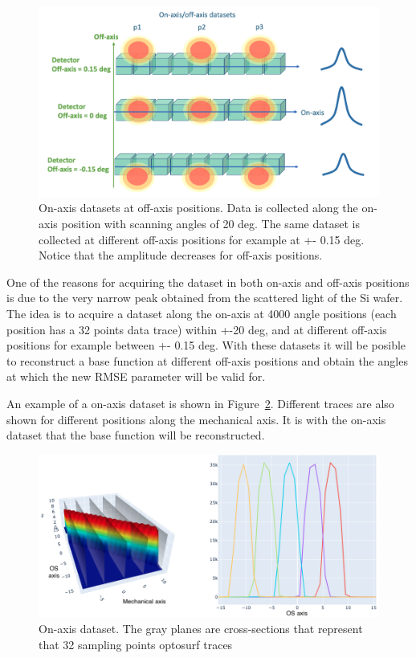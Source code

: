 \documentclass[
  letterpaper,
  DIV=11,
  numbers=noendperiod,
  oneside]{scrreprt}
\begin{document}
\begin{figure}

{\centering \includegraphics{notebooks/figures/b/fig_3_3_onoffaxis.png}

}

\caption{\label{fig-3-7}On-axis datasets at off-axis positions. Data is
collected along the on-axis position with scanning angles of 20 deg. The
same dataset is collected at different off-axis positions for example at
+- 0.15 deg. Notice that the amplitude decreases for off-axis
positions.}

\end{figure}

One of the reasons for acquiring the dataset in both on-axis and
off-axis positions is due to the very narrow peak obtained from the
scattered light of the Si wafer. The idea is to acquire a dataset along
the on-axis at 4000 angle positions (each position has a 32 points data
trace) within +-20 deg, and at different off-axis positions for example
between +- 0.15 deg. With these datasets it will be posible to
reconstruct a base function at different off-axis positions and obtain
the angles at which the new RMSE parameter will be valid for.

An example of a on-axis dataset is shown in Figure~\ref{fig-3-8}.
Different traces are also shown for different positions along the
mechanical axis. It is with the on-axis dataset that the base function
will be reconstructed.

\begin{figure}

{\centering \includegraphics{notebooks/figures/b/fig_3_3_onaxis.png}

}

\caption{\label{fig-3-8}On-axis dataset. The gray planes are
cross-sections that represent that 32 sampling points optosurf traces}

\end{figure}
\end{document}
